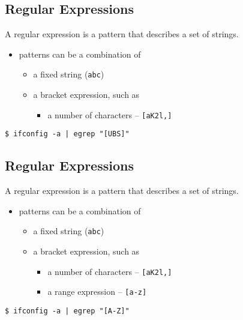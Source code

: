 \documentclass[xga]{xdvislides}
\begin{document}
\subsection{Regular Expressions}
A regular expression is a pattern that describes a set of strings. \\

\begin{itemize}
	\item patterns can be a combination of
		\begin{itemize}
			\item a fixed string (\verb+abc+)
			\item a bracket expression, such as
				\begin{itemize}
					\item a number of characters -- \verb+[aK2l,]+
				\end{itemize}
		\end{itemize}
\end{itemize}
\vspace{.5in}
\begin{verbatim}
$ ifconfig -a | egrep "[UBS]"
\end{verbatim}

\subsection{Regular Expressions}
A regular expression is a pattern that describes a set of strings. \\

\begin{itemize}
	\item patterns can be a combination of
		\begin{itemize}
			\item a fixed string (\verb+abc+)
			\item a bracket expression, such as
				\begin{itemize}
					\item a number of characters -- \verb+[aK2l,]+
					\item a range expression -- \verb+[a-z]+
				\end{itemize}
		\end{itemize}
\end{itemize}
\vspace{.5in}
\begin{verbatim}
$ ifconfig -a | egrep "[A-Z]"
\end{verbatim}
\end{document}
